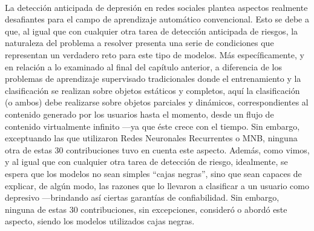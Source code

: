 \

La detección anticipada de depresión en redes sociales plantea aspectos realmente desafiantes para el campo de aprendizaje automático convencional.
Esto se debe a que, al igual que con cualquier otra tarea de detección anticipada de riesgos, la naturaleza del problema a resolver presenta una serie de condiciones que representan un verdadero reto para este tipo de modelos.
Más específicamente, y en relación a lo examinado al final del capítulo anterior, a diferencia de los problemas de aprendizaje supervisado tradicionales donde el entrenamiento y la clasificación se realizan sobre objetos estáticos y completos, aquí la clasificación (o ambos) debe realizarse sobre objetos parciales y dinámicos, correspondientes al contenido generado por los usuarios hasta el momento, desde un flujo de contenido virtualmente infinito ---ya que éste crece con el tiempo.
Sin embargo, exceptuando las que utilizaron Redes Neuronales Recurrentes o \ac{MNB}, ninguna otra de estas 30 contribuciones tuvo en cuenta este aspecto. 
Además, como vimos, y al igual que con cualquier otra tarea de detección de riesgo, idealmente, se espera que los modelos no sean simples ``cajas negras'', sino que sean capaces de explicar, de algún modo, las razones que lo llevaron a clasificar a un usuario como depresivo ---brindando así ciertas garantías de confiabilidad.
Sin embargo, ninguna de estas 30 contribuciones, sin excepciones, consideró o abordó este aspecto, siendo los modelos utilizados cajas negras.
